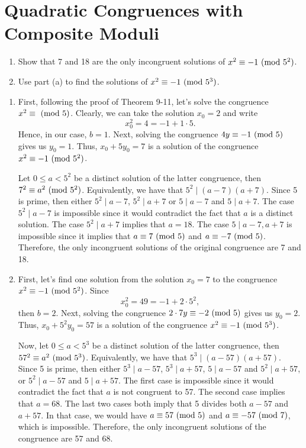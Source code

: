 \section{Quadratic Congruences with Composite Moduli}

\begin{exercise}
    \begin{enumerate}
        \item Show that 7 and 18 are the only incongruent solutions of $x^2 \equiv -1 \ (\mathrm{mod}\ 5^2)$.
        \item Use part (a) to find the solutions of $x^2 \equiv -1 \ (\mathrm{mod}\ 5^3)$.\\
    \end{enumerate}
\end{exercise}

\begin{solution}
    \begin{enumerate}
        \item First, following the proof of Theorem 9-11, let's solve the congruence $x^2 \equiv \ (\mathrm{mod}\ 5)$. Clearly, we can take the solution $x_0 = 2$ and write
        $$x_0^2 = 4 = -1 + 1 \cdot 5.$$
        Hence, in our case, $b = 1$. Next, solving the congruence $4y \equiv -1 \ (\mathrm{mod}\ 5)$ gives us $y_0 = 1$. Thus, $x_0 + 5y_0 = 7$ is a solution of the congruence $x^2 \equiv -1 \ (\mathrm{mod}\ 5^2)$. 
        
        Let $0 \leq a < 5^2$ be a distinct solution of the latter congruence, then $7^2 \equiv a^2 \ (\mathrm{mod}\ 5^2)$. Equivalently, we have that $5^2 \mid (a-7)(a+7)$. Since 5 is prime, then either $5^2 \mid a - 7$, $5^2 \mid a + 7$ or $5 \mid a - 7$ and $5 \mid a + 7$. The case $5^2 \mid a - 7$ is impossible since it would contradict the fact that $a$ is a distinct solution. The case $5^2 \mid a + 7$ implies that $a = 18$. The case $5 \mid a - 7, a+ 7$ is impossible since it implies that $a \equiv 7 \ (\mathrm{mod}\ 5)$ and $a \equiv -7 \ (\mathrm{mod}\ 5)$. Therefore, the only incongruent solutions of the original congruence are 7 and 18.
        \item First, let's find one solution from the solution $x_0 = 7$ to the congruence $x^2 \equiv -1 \ (\mathrm{mod}\ 5^2)$. Since
        $$x_0^2 = 49 = -1 + 2 \cdot 5^2,$$
        then $b = 2$. Next, solving the congruence $2\cdot 7y \equiv -2 \ (\mathrm{mod}\ 5)$ gives us $y_0 = 2$. Thus, $x_0 + 5^2y_0 = 57$ is a solution of the congruence $x^2 \equiv -1 \ (\mathrm{mod}\ 5^3)$. 
        
        Now, let $0 \leq a < 5^3$ be a distinct solution of the latter congruence, then $57^2 \equiv a^2 \ (\mathrm{mod}\ 5^3)$. Equivalently, we have that $5^3 \mid (a-57)(a+57)$. Since 5 is prime, then either $5^3 \mid a - 57$, $5^3 \mid a + 57$, $5 \mid a - 57$ and $5^2 \mid a + 57$, or $5^2 \mid a - 57$ and $5 \mid a + 57$. The first case is impossible since it would contradict the fact that $a$ is not congruent to 57. The second case implies that $a = 68$. The last two cases both imply that 5 divides both $a - 57$ and $a + 57$. In that case, we would have $a \equiv 57 \ (\mathrm{mod}\ 5)$ and $a \equiv -57 \ (\mathrm{mod}\ 7)$, which is impossible. Therefore, the only incongruent solutions of the congruence are 57 and 68.\\
    \end{enumerate}
\end{solution}

